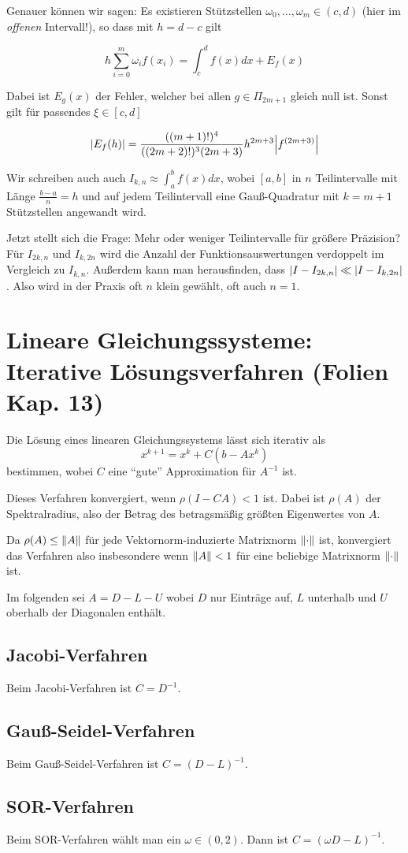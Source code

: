 \documentclass[a4paper,parskip=half*,DIV=7,fontsize=11pt]{scrartcl}
\DeclarePairedDelimiter\abs{\lvert}{\rvert}
\DeclarePairedDelimiter\norm{\lVert}{\rVert}
\begin{document}
Genauer können wir sagen: Es existieren Stützstellen $\omega_0, \ldots, \omega_m \in (c, d)$ (hier im \emph{offenen} Intervall!), so dass mit $h = d - c$ gilt

\[ 
  h \sum_{i=0}^m \omega_i f(x_i) = \int_c^d f(x) dx + E_f(x)
\]

Dabei ist $E_g(x)$ der Fehler, welcher bei allen $g \in \Pi_{2m+1}$ gleich null ist. Sonst gilt für passendes $\xi \in [c, d]$

\[
  \abs*{E_f(h)} = \frac{((m+1)!)^4}{((2m+2)!)^3 (2m+3)} h^{2m+3} \abs*{f^{(2m+3)}}
\]

Wir schreiben auch auch $I_{k,n} \approx \int_a^b f(x) dx$, wobei $[a, b]$ in $n$ Teilintervalle mit Länge $\frac{b-a}{n} = h$ und auf jedem Teilintervall eine Gauß-Quadratur mit $k = m + 1$ Stützstellen angewandt wird.

Jetzt stellt sich die Frage: Mehr oder weniger Teilintervalle für größere Präzision? Für $I_{2k,n}$ und $I_{k,2n}$ wird die Anzahl der Funktionsauswertungen verdoppelt im Vergleich zu $I_{k,n}$. Außerdem kann man herausfinden, dass $\abs{I - I_{2k,n}} \ll \abs{I - I_{k,2n}}$. Also wird in der Praxis oft $n$ klein gewählt, oft auch $n = 1$.

\section{Lineare Gleichungssysteme: Iterative Lösungsverfahren (Folien Kap. 13)}

Die Lösung eines linearen Gleichungssystems lässt sich iterativ als
\[x^{k+1} = x^k+ C(b-Ax^k)\]
bestimmen, wobei $C$ eine ``gute'' Approximation für $A^{-1}$ ist.

Dieses Verfahren konvergiert, wenn $\rho(I-CA) < 1$ ist. Dabei ist $\rho(A)$ der Spektralradius, also der Betrag des betragsmäßig größten Eigenwertes von $A$.

Da $\rho(A) \le \norm{A}$ für jede Vektornorm-induzierte Matrixnorm $\norm{\cdot}$ ist, konvergiert das Verfahren also insbesondere wenn $\norm{A} < 1$ für eine beliebige Matrixnorm $\norm{\cdot}$ ist.

Im folgenden sei $A = D-L-U$ wobei $D$ nur Einträge auf, $L$ unterhalb und $U$ oberhalb der Diagonalen enthält.

\subsection{Jacobi-Verfahren}

Beim Jacobi-Verfahren ist $C = D^{-1}$.

\subsection{Gauß-Seidel-Verfahren}

Beim Gauß-Seidel-Verfahren ist $C = (D-L)^{-1}$.

\subsection{SOR-Verfahren}

Beim SOR-Verfahren wählt man ein $\omega \in (0,2)$. Dann ist $C = (\omega D - L)^{-1}$.
\end{document}
